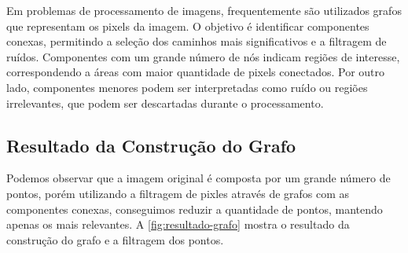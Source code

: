 Em problemas de processamento de imagens, frequentemente são utilizados grafos que representam os pixels da imagem. O objetivo é identificar componentes conexas, permitindo a seleção dos caminhos mais significativos e a filtragem de ruídos. Componentes com um grande número de nós indicam regiões de interesse, correspondendo a áreas com maior quantidade de pixels conectados. Por outro lado, componentes menores podem ser interpretadas como ruído ou regiões irrelevantes, que podem ser descartadas durante o processamento.

\subsection{Resultado da Construção do Grafo}
\label{sec:resultado-construcao-grafo}

Podemos observar que a imagem original é composta por um grande número de pontos, porém utilizando a filtragem de pixles através de grafos com as componentes conexas, conseguimos reduzir a quantidade de pontos, mantendo apenas os mais relevantes. A \autoref{fig:resultado-grafo} mostra o resultado da construção do grafo e a filtragem dos pontos.

